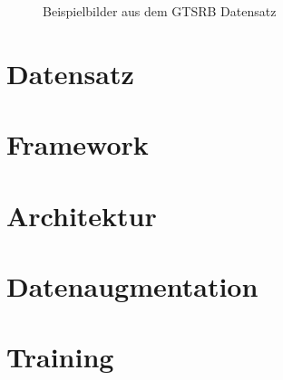 \begin{figure}[H]
\begin{subfigure}[b]{0.2\textwidth}
    \caption{}
    \label{fig:gtrsb-paper-bsp-image-4}
\end{subfigure}
      \caption{Beispielbilder aus dem \acs{GTSRB} Datensatz \cite{GTSRB}}
      \label{fig:gtrsb-paper-bsp-images}
\end{figure}
\cite{GTSRB}
\section{Datensatz}
\section{Framework}
\section{Architektur}
\section{Datenaugmentation}
\section{Training}